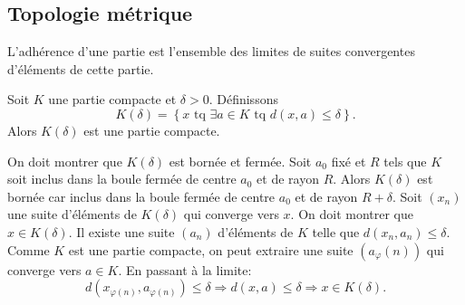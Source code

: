 \subsection{Topologie métrique} \label{Topologie}
L'adhérence d'une partie est l'ensemble des limites de suites convergentes d'éléments de cette partie.
\begin{propn} \label{compactEtendu}
Soit $K$ une partie compacte et $\delta >0$. Définissons
\begin{displaymath}
 K(\delta) = \left\lbrace x \text{ tq } \exists a \in K \text{ tq } d(x,a)\leq \delta  \right\rbrace.
\end{displaymath}
Alors $K(\delta)$ est une partie compacte.
\end{propn}
\begin{demo}
 On doit montrer que $K(\delta)$ est bornée et fermée.\newline
 Soit $a_0$ fixé et $R$ tels que $K$ soit inclus dans la boule fermée de centre $a_0$ et de rayon $R$. Alors $K(\delta)$ est bornée car inclus dans la boule fermée de centre $a_0$ et de rayon $R + \delta$.\newline
 Soit $(x_n)$ une suite d'éléments de $K(\delta)$ qui converge vers $x$. On doit montrer que $x \in K(\delta)$.\newline
 Il existe une suite $(a_n)$ d'éléments de $K$ telle que $d(x_n,a_n)\leq \delta$. Comme $K$ est une partie compacte, on peut extraire une suite $(a_\varphi(n))$ qui converge vers $a \in K$. En passant à la limite:
 \begin{displaymath}
  d(x_{\varphi(n)},a_{\varphi(n)})\leq \delta \Rightarrow d(x,a) \leq \delta \Rightarrow x \in K(\delta).
 \end{displaymath}
\end{demo}
